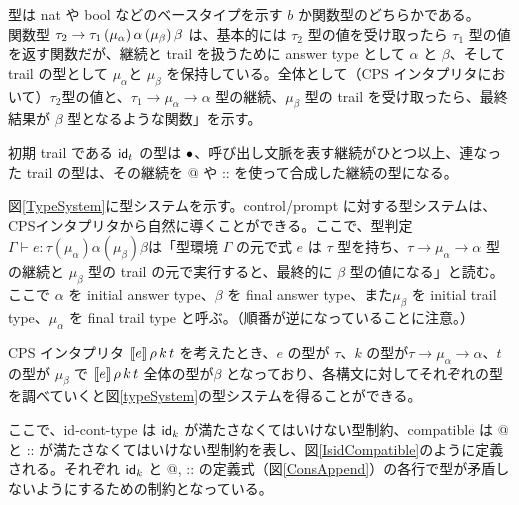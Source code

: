 \documentclass[japanese,draft]{jssst_ppl} %
\begin{document}
型は nat や bool などのベースタイプを示す $b$ か関数型のどちらかである。\\
関数型 ${\tau_2}\rightarrow{\tau_1}\,(\mu_{\alpha})\,\alpha\,(\mu_{\beta})\,\beta$ は、基本的には $\tau_2$ 型の値を受け取ったら $\tau_1$ 型の値を返す関数だが、継続と trail を扱うために answer type として $\alpha$ と $\beta$、そして trail の型として $\mu_{\alpha}$と $\mu_{\beta}$ を保持している。全体として（CPS インタプリタにおいて）$\tau_2$型の値と、$\tau_1 \rightarrow \mu_{\alpha} \rightarrow \alpha$ 型の継続、$\mu_{\beta}$ 型の trail を受け取ったら、最終結果が $\beta$ 型となるような関数」を示す。

初期 trail である $\textsf{id}_t$ の型は $\bullet$、呼び出し文脈を表す継続がひとつ以上、連なった trail の型は、その継続を @ や :: を使って合成した継続の型になる。

図\ref{TypeSystem}に型システムを示す。control/prompt に対する型システムは、CPSインタプリタから自然に導くことができる\cite{FSCD2021}。ここで、型判定$\Gamma \vdash e : \tau(\mu_{\alpha})\alpha(\mu_{\beta})\beta$は「型環境 $\Gamma$ の元で式 $e$ は $\tau$ 型を持ち、$\tau \rightarrow \mu_{\alpha} \rightarrow \alpha$ 型の継続と $\mu_{\beta}$ 型の trail の元で実行すると、最終的に $\beta$ 型の値になる」と読む。
ここで $\alpha$ を initial answer type、$\beta$ を final answer type、また$\mu_{\beta}$ を initial trail type、$\mu_{\alpha}$ を final trail type と呼ぶ。（順番が逆になっていることに注意。）

CPS インタプリタ $[\![{e}]\!]\,\rho\,k\,t$ を考えたとき、$e$ の型が $\tau$、$k$ の型が$\tau \rightarrow \mu_{\alpha} \rightarrow \alpha$、$t$ の型が $\mu_{\beta}$ で $[\![{e}]\!]\,\rho\,k\,t$ 全体の型が$\beta$ となっており、各構文に対してそれぞれの型を調べていくと図\ref{typeSystem}の型システムを得ることができる。

ここで、\textsf{id-cont-type} は $\textsf{id}_k$ が満たさなくてはいけない型制約、\textsf{compatible} は @ と :: が満たさなくてはいけない型制約を表し、図\ref{IsidCompatible}のように定義される。それぞれ $\textsf{id}_k$ と @, :: の定義式（図\ref{ConsAppend}）の各行で型が矛盾しないようにするための制約となっている。
\end{document}
